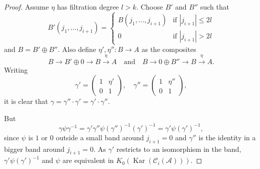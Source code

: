\documentclass{article}
\theoremstyle{definition}
\newcommand{\CA}{{ \mathcal A}}
\begin{document}
\begin{proof}
 
Assume $\eta$ has filtration degree $l > k$. Choose $B'$ and $B''$ such that
\[
B'(j_1, \dots, j_{i+1}) =
\begin{cases}
B(j_1, \dots, j_{i+1}) & \text{if } |j_{i+1}| \leq 2l \\
0 & \text{if } |j_{i+1}| > 2l
\end{cases}
\]
and $B = B' \oplus B''$. Also define $\eta', \eta'' : B \to A$ as the composites
\[
B \to B' \oplus 0 \to B \xrightarrow{\eta} A \quad \text{and} \quad B \to 0 \oplus B'' \to B \xrightarrow{\eta} A.
\]
Writing
\[
\gamma' = \begin{pmatrix} 1 & \eta' \\ 0 & 1 \end{pmatrix}, \quad \gamma'' = \begin{pmatrix} 1 & \eta'' \\ 0 & 1 \end{pmatrix},
\]
it is clear that $\gamma = \gamma'' \cdot \gamma' = \gamma' \cdot \gamma''$.

But
\[
\gamma \psi \gamma^{-1} = \gamma' \gamma'' \psi (\gamma'')^{-1} (\gamma')^{-1} = \gamma' \psi (\gamma')^{-1},
\]
 since $\psi$ is $1$ or $0$ outside a small band around $j_{i+1} = 0$ and $\gamma''$ is the identity in a bigger band around $j_{i+1} = 0$. As $\gamma'$ restricts to an isomorphism in the band, $\gamma' \psi (\gamma')^{-1}$ and $\psi$ are equivalent in $K_0(\operatorname{Kar}(\mathcal{C}_{i}(\CA))).$
   
\end{proof}
\end{document}
